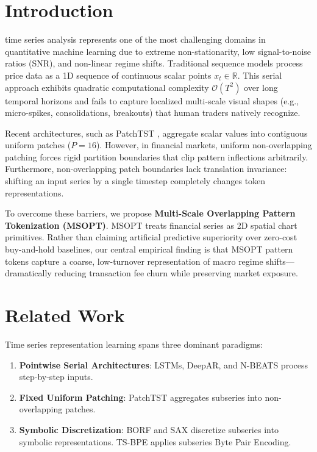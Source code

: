 \documentclass[10pt,journal,compsoc]{IEEEtran}
\begin{document}
\section{Introduction}
 time series analysis represents one of the most challenging domains in quantitative machine learning due to extreme non-stationarity, low signal-to-noise ratios (SNR), and non-linear regime shifts. Traditional sequence models process price data as a 1D sequence of continuous scalar points $x_t \in \mathbb{R}$. This serial approach exhibits quadratic computational complexity $\mathcal{O}(T^2)$ over long temporal horizons and fails to capture localized multi-scale visual shapes (e.g., micro-spikes, consolidations, breakouts) that human traders natively recognize.

Recent architectures, such as PatchTST \cite{nie2023patchtst}, aggregate scalar values into contiguous uniform patches ($P=16$). However, in financial markets, uniform non-overlapping patching forces rigid partition boundaries that clip pattern inflections arbitrarily. Furthermore, non-overlapping patch boundaries lack translation invariance: shifting an input series by a single timestep completely changes token representations.

To overcome these barriers, we propose \textbf{Multi-Scale Overlapping Pattern Tokenization (MSOPT)}. MSOPT treats financial series as 2D spatial chart primitives. Rather than claiming artificial predictive superiority over zero-cost buy-and-hold baselines, our central empirical finding is that MSOPT pattern tokens capture a coarse, low-turnover representation of macro regime shifts—dramatically reducing transaction fee churn while preserving market exposure.

\section{Related Work}
Time series representation learning spans three dominant paradigms:
\begin{enumerate}
    \item \textbf{Pointwise Serial Architectures}: LSTMs, DeepAR, and N-BEATS process step-by-step inputs.
    \item \textbf{Fixed Uniform Patching}: PatchTST \cite{nie2023patchtst} aggregates subseries into non-overlapping patches.
    \item \textbf{Symbolic Discretization}: BORF \cite{spinnato2024borf} and SAX \cite{lin2003sax} discretize subseries into symbolic representations. TS-BPE \cite{gotz2025tsbpe} applies subseries Byte Pair Encoding.
\end{enumerate}
\end{document}
